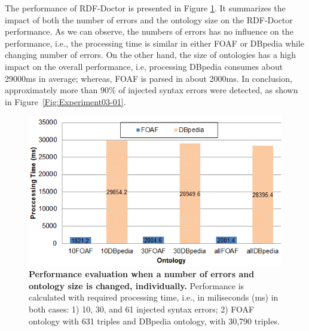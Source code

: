 The performance of RDF-Doctor is presented in Figure \ref{Fig:Experiment03-03}. 
It summarizes the impact of both the number of errors and the ontology size on the RDF-Doctor performance.
As we can observe, the numbers of errors has no influence on the performance, i.e., the processing time is similar in either FOAF or DBpedia while changing number of errors. 
On the other hand, the size of ontologies has a high impact on the overall performance, i.e, processing DBpedia consumes about 29000ms in average; whereas, FOAF is parsed in about 2000ms. In conclusion, approximately more than 90\% of injected syntax errors were detected, as shown in Figure~\ref{Fig:Experiment03-01}. 

\begin{figure}[ht]
\begin{center}
		\includegraphics[scale=0.9,angle=0]{images/Experiment03-03.png}
		\vspace*{-4mm}
		\caption{\textbf{Performance evaluation when a number of errors and ontology size is changed, individually.} 
		Performance is calculated with required processing time, i.e., in miliseconds (ms) in both cases: 1) 10, 30, and 61 injected syntax errors; 2) FOAF ontology with 631 triples and DBpedia ontology, with 30,790 triples.}
\label{Fig:Experiment03-03}

\end{center}
\end{figure}
